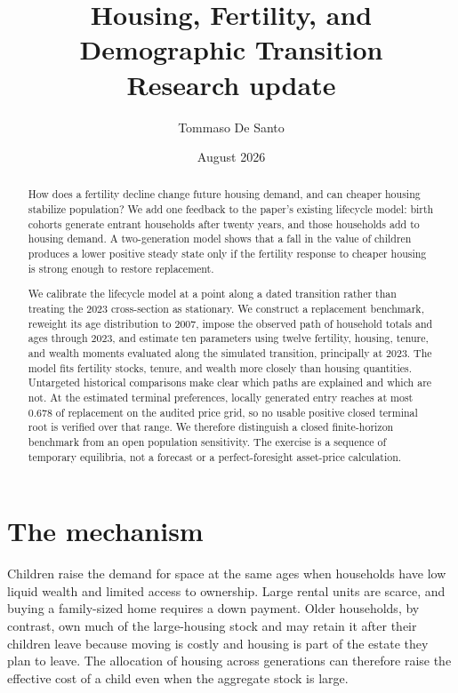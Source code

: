 \documentclass[11pt]{article}
\title{Housing, Fertility, and Demographic Transition\\
\large Research update}
\author{Tommaso De Santo}
\date{August 2026}
\theoremstyle{definition}
\newcommand{\1}{\mathbf 1}
\begin{document}
\maketitle

\begin{abstract}
How does a fertility decline change future housing demand, and can cheaper
housing stabilize population? We add one feedback to the paper's existing
lifecycle model: birth cohorts generate entrant households after twenty years,
and those households add to housing demand. A two-generation model shows that a
fall in the value of children produces a lower positive steady state only if
the fertility response to cheaper housing is strong enough to restore
replacement.

We calibrate the lifecycle model at a point along a dated transition rather
than treating the 2023 cross-section as stationary. We construct a replacement
benchmark, reweight its age distribution to 2007, impose the observed path of
household totals and ages through 2023, and estimate ten parameters using
twelve fertility, housing, tenure, and wealth moments evaluated along the
simulated transition, principally at 2023. The model fits fertility stocks, tenure, and wealth more closely
than housing quantities. Untargeted historical comparisons make clear which
paths are explained and which are not. At the estimated terminal preferences,
locally generated entry reaches at most 0.678 of replacement on the audited
price grid, so no usable positive closed terminal root is verified over that
range. We therefore distinguish a closed finite-horizon benchmark from an open
population sensitivity. The exercise is a sequence of temporary equilibria,
not a forecast or a perfect-foresight asset-price calculation.
\end{abstract}

\section{The mechanism}

Children raise the demand for space at the same ages when households have low
liquid wealth and limited access to ownership. Large rental units are scarce,
and buying a family-sized home requires a down payment. Older households, by
contrast, own much of the large-housing stock and may retain it after their
children leave because moving is costly and housing is part of the estate they
plan to leave. The allocation of housing across generations can therefore
raise the effective cost of a child even when the aggregate stock is large.
\end{document}
